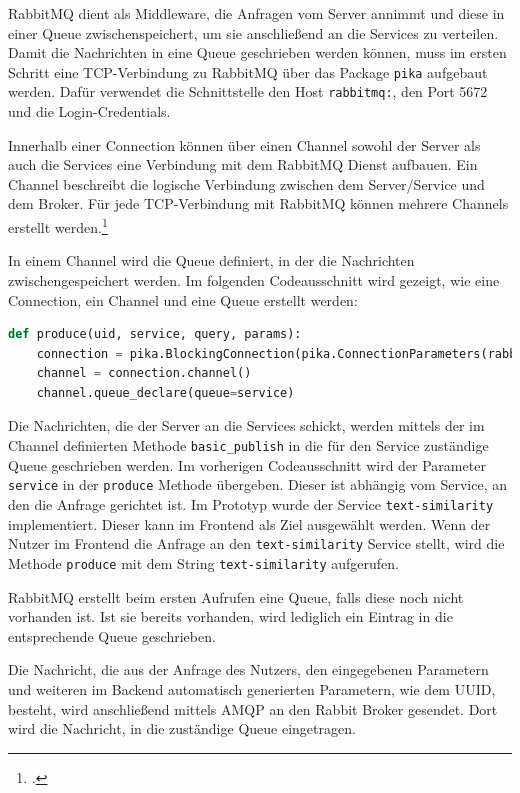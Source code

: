 RabbitMQ dient als Middleware, die Anfragen vom Server annimmt und diese in einer Queue zwischenspeichert, um sie anschließend an die Services zu verteilen. Damit die Nachrichten in eine Queue geschrieben werden können, muss im ersten Schritt eine TCP-Verbindung zu RabbitMQ über das Package \texttt{pika} aufgebaut werden. Dafür verwendet die Schnittstelle den Host  \texttt{rabbitmq:}, den Port 5672 und die Login-Credentials.

Innerhalb einer Connection können über einen Channel sowohl der Server als auch die Services eine Verbindung mit dem RabbitMQ Dienst aufbauen. Ein Channel beschreibt die logische Verbindung zwischen dem Server/Service und dem Broker. Für jede TCP-Verbindung mit RabbitMQ können mehrere Channels erstellt werden.\footcite{dossot2014rabbitmq}

In einem Channel wird die Queue definiert, in der die Nachrichten zwischengespeichert werden. Im folgenden Codeausschnitt wird gezeigt, wie eine Connection, ein Channel und eine Queue erstellt werden:

\begin{lstlisting}[language=Python, caption={Verbindung zu RabbitMQ und Erstellung eines Channels und einer Queue}]
def produce(uid, service, query, params):
    connection = pika.BlockingConnection(pika.ConnectionParameters(rabbit_host, 5672, '/', credentials))
    channel = connection.channel()
    channel.queue_declare(queue=service)
\end{lstlisting}

Die Nachrichten, die der Server an die Services schickt, werden mittels der im Channel definierten Methode \texttt{basic\_{}publish} in die für den Service zuständige Queue geschrieben werden. Im vorherigen Codeausschnitt wird der Parameter \texttt{service} in der \texttt{produce} Methode übergeben. Dieser ist abhängig vom Service, an den die Anfrage gerichtet ist. Im Prototyp wurde der Service \texttt{text-similarity} implementiert. Dieser kann im Frontend als Ziel ausgewählt werden. Wenn der Nutzer im Frontend die Anfrage an den \texttt{text-similarity} Service stellt, wird die Methode \texttt{produce} mit dem String \texttt{\glqq text-similarity\grqq{}} aufgerufen.

RabbitMQ erstellt beim ersten Aufrufen eine Queue, falls diese noch nicht vorhanden ist. Ist sie bereits vorhanden, wird lediglich ein Eintrag in die entsprechende Queue geschrieben.

Die Nachricht, die aus der Anfrage des Nutzers, den eingegebenen Parametern und weiteren im Backend automatisch generierten Parametern, wie dem UUID, besteht, wird anschließend mittels AMQP an den Rabbit Broker gesendet. Dort wird die Nachricht, in die zuständige Queue eingetragen. 

